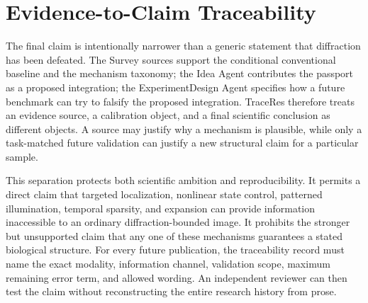\documentclass[conference]{IEEEtran}
\begin{document}
\section{Evidence-to-Claim Traceability}

The final claim is intentionally narrower than a generic statement that diffraction has been defeated. The Survey sources support the conditional conventional baseline and the mechanism taxonomy; the Idea Agent contributes the passport as a proposed integration; the ExperimentDesign Agent specifies how a future benchmark can try to falsify the proposed integration. TraceRes therefore treats an evidence source, a calibration object, and a final scientific conclusion as different objects. A source may justify why a mechanism is plausible, while only a task-matched future validation can justify a new structural claim for a particular sample.

This separation protects both scientific ambition and reproducibility. It permits a direct claim that targeted localization, nonlinear state control, patterned illumination, temporal sparsity, and expansion can provide information inaccessible to an ordinary diffraction-bounded image. It prohibits the stronger but unsupported claim that any one of these mechanisms guarantees a stated biological structure. For every future publication, the traceability record must name the exact modality, information channel, validation scope, maximum remaining error term, and allowed wording. An independent reviewer can then test the claim without reconstructing the entire research history from prose.
\end{document}
